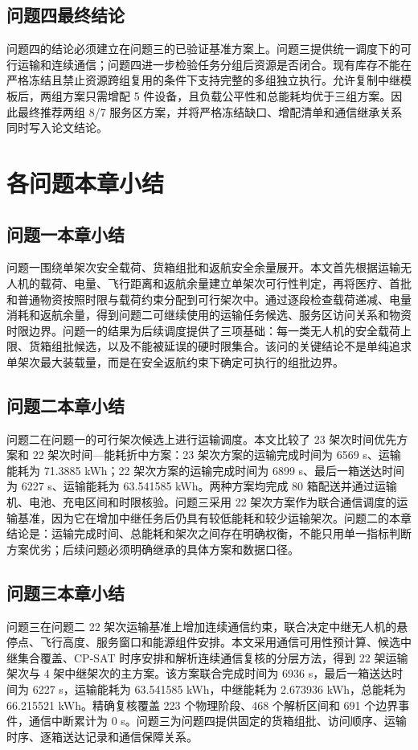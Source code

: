 \documentclass[UTF8,a4paper,12pt]{ctexart}
\begin{document}
\subsection{问题四最终结论}
问题四的结论必须建立在问题三的已验证基准方案上。问题三提供统一调度下的可行运输和连续通信；问题四进一步检验任务分组后资源是否闭合。现有库存不能在严格冻结且禁止资源跨组复用的条件下支持完整的多组独立执行。允许复制中继模板后，两组方案只需增配 5 件设备，且负载公平性和总能耗均优于三组方案。因此最终推荐两组 8/7 服务区方案，并将严格冻结缺口、增配清单和通信继承关系同时写入论文结论。
\section{各问题本章小结}
\subsection{问题一本章小结}
问题一围绕单架次安全载荷、货箱组批和返航安全余量展开。本文首先根据运输无人机的载荷、电量、飞行距离和返航余量建立单架次可行性判定，再将医疗、首批和普通物资按照时限与载荷约束分配到可行架次中。通过逐段检查载荷递减、电量消耗和返航余量，得到问题二可继续使用的运输任务候选、服务区访问关系和物资时限边界。问题一的结果为后续调度提供了三项基础：每一类无人机的安全载荷上限、货箱组批候选，以及不能被延误的硬时限集合。该问的关键结论不是单纯追求单架次最大装载量，而是在安全返航约束下确定可执行的组批边界。

\subsection{问题二本章小结}
问题二在问题一的可行架次候选上进行运输调度。本文比较了 23 架次时间优先方案和 22 架次时间—能耗折中方案：23 架次方案的运输完成时间为 6569 s、运输能耗为 71.3885 kWh；22 架次方案的运输完成时间为 6899 s、最后一箱送达时间为 6227 s、运输能耗为 63.541585 kWh。两种方案均完成 80 箱配送并通过运输机、电池、充电区间和时限核验。问题三采用 22 架次方案作为联合通信调度的运输基准，因为它在增加中继任务后仍具有较低能耗和较少运输架次。问题二的本章结论是：运输完成时间、总能耗和架次之间存在明确权衡，不能只用单一指标判断方案优劣；后续问题必须明确继承的具体方案和数据口径。

\subsection{问题三本章小结}
问题三在问题二 22 架次运输基准上增加连续通信约束，联合决定中继无人机的悬停点、飞行高度、服务窗口和能源组件安排。本文采用通信可用性预计算、候选中继集合覆盖、CP-SAT 时序安排和解析连续通信复核的分层方法，得到 22 架运输架次与 4 架中继架次的主方案。该方案联合完成时间为 6936 s，最后一箱送达时间为 6227 s，运输能耗为 63.541585 kWh，中继能耗为 2.673936 kWh，总能耗为 66.215521 kWh。精确复核覆盖 223 个物理阶段、468 个解析区间和 691 个边界事件，通信中断累计为 0 s。问题三为问题四提供固定的货箱组批、访问顺序、运输时序、逐箱送达记录和通信保障关系。
\end{document}
